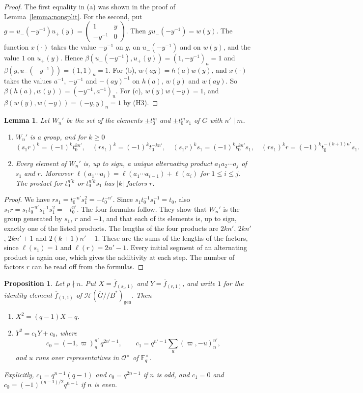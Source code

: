\documentclass[12pt,letterpaper]{amsart}
\numberwithin{equation}{section}
\newtheorem{proposition}[theorem]{Proposition}
\newtheorem{lemma}[theorem]{Lemma}
\theoremstyle{definition}
\theoremstyle{remark}
\newcommand{\cO}{\mathcal{O}}
\newcommand{\cH}{\mathcal{H}}
\newcommand{\Fq}{\mathbb{F}_q}
\newcommand{\Gbar}{\overline{G}}
\newcommand{\gen}{\mathrm{gen}}
\newcommand{\fbar}{\overline{f}}
\newcommand{\mat}[4]{\begin{pmatrix} #1 & #2\\ #3 & #4\end{pmatrix}}
\begin{document}
\begin{proof}
The first equality in (a) was shown in the proof of
Lemma~\ref{lemma:nonsplit}. For the second, put
$g=u_-(-y^{-1})u_+(y)=\mat 1y{-y^{-1}}0$. Then $gu_-(-y^{-1})=w(y)$.
The function $x(\cdot)$ takes the value $-y^{-1}$ on $g$, on
$u_-(-y^{-1})$ and on $w(y)$, and the value $1$ on $u_+(y)$. Hence
$\beta(u_-(-y^{-1}),u_+(y))=(1,-y^{-1})_n=1$ and
$\beta(g,u_-(-y^{-1}))=(1,1)_n=1$. For (b), $w(ay)=h(a)w(y)$, and
$x(\cdot)$ takes the values $a^{-1}$, $-y^{-1}$ and $-(ay)^{-1}$ on
$h(a)$, $w(y)$ and $w(ay)$. So $\beta(h(a),w(y))=(-y^{-1},a^{-1})_n$.
For (c), $w(y)w(-y)=1$, and $\beta(w(y),w(-y))=(-y,y)_n=1$ by (H3).
\end{proof}

\begin{lemma}
\label{lemma:words}
Let $W_n'$ be the set of the elements $\pm t_0^m$ and $\pm t_0^ms_1$ of
$G$ with $n'\mid m$.
\begin{enumerate}[leftmargin=2em,label=(\alph*)]
\item $W_n'$ is a group, and for $k\geq 0$
\[
(s_1r)^k=(-1)^kt_0^{kn'},\quad (rs_1)^k=(-1)^kt_0^{-kn'},\quad
(s_1r)^ks_1=(-1)^kt_0^{kn'}s_1,\quad
(rs_1)^kr=(-1)^kt_0^{-(k+1)n'}s_1 .
\]
\item Every element of $W_n'$ is, up to sign, a unique alternating
product $a_1a_2\cdots a_j$ of $s_1$ and $r$. Moreover
$\ell(a_1\cdots a_i)=\ell(a_1\cdots a_{i-1})+\ell(a_i)$ for $1\leq
i\leq j$. The product for $t_0^{n'k}$ or $t_0^{n'k}s_1$ has $|k|$
factors $r$.
\end{enumerate}
\end{lemma}

\begin{proof}
We have $rs_1=t_0^{-n'}s_1^2=-t_0^{-n'}$. Since
$s_1t_0^{-1}s_1^{-1}=t_0$, also $s_1r=s_1t_0^{-n'}s_1^{-1}s_1^2
=-t_0^{n'}$. The four formulas follow. They show that $W_n'$ is the
group generated by $s_1$, $r$ and $-1$, and that each of its elements
is, up to sign, exactly one of the listed products. The lengths of the
four products are $2kn'$, $2kn'$, $2kn'+1$ and $2(k+1)n'-1$. These are
the sums of the lengths of the factors, since $\ell(s_1)=1$ and
$\ell(r)=2n'-1$. Every initial segment of an alternating product is
again one, which gives the additivity at each step. The number of
factors $r$ can be read off from the formulas.
\end{proof}

\begin{proposition}
\label{prop:quadratic}
Let $p\nmid n$. Put $X=\fbar_{(s_1,1)}$ and $Y=\fbar_{(r,1)}$, and
write $1$ for the identity element $\fbar_{(1,1)}$ of
$\cH(\Gbar/\!/B^*)_{\gen}$. Then
\begin{enumerate}[leftmargin=2em,label=(\alph*)]
\item $X^2=(q-1)X+q$.
\item $Y^2=c_1Y+c_0$, where
\[
c_0=(-1,\varpi)_n^{n'}\,q^{2n'-1},\qquad
c_1=q^{n'-1}\sum_{u}(\varpi,-u)_n^{n'},
\]
and $u$ runs over representatives in $\cO^\times$ of $\Fq^\times$.
\end{enumerate}
Explicitly, $c_1=q^{n-1}(q-1)$ and $c_0=q^{2n-1}$ if $n$ is odd, and
$c_1=0$ and $c_0=(-1)^{(q-1)/2}q^{n-1}$ if $n$ is even.
\end{proposition}
\end{document}
